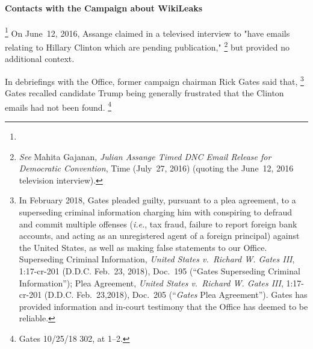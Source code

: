 \paragraph{Contacts with the Campaign about WikiLeaks}

\footnote{}
On June~12, 2016, Assange claimed in a televised interview to "have emails relating to Hillary Clinton which are pending publication,"%
\footnote{\textit{See} Mahita Gajanan, \textit{Julian Assange Timed DNC Email Release for Democratic Convention}, Time (July~27, 2016) (quoting the June~12, 2016 television interview).}
but provided no additional context.

In debriefings with the Office, former campaign chairman Rick Gates said that, %
\footnote{In February 2018, Gates pleaded guilty, pursuant to a plea agreement, to a superseding criminal information charging him with conspiring to defraud and commit multiple offenses (\textit{i.e.}, tax fraud, failure to report foreign bank accounts, and acting as an unregistered agent of a foreign principal) against the United States, as well as making false statements to our Office.
Superseding Criminal Information, \textit{United States v.\ Richard W. Gates III}, 1:17-cr-201 (D.D.C. Feb.~23, 2018), Doc.~195 (“Gates Superseding Criminal Information”);
Plea Agreement, \textit{United States v.\ Richard W. Gates III}, 1:17-cr-201 (D.D.C. Feb.~23,2018), Doc.~205 (“\textit{Gates} Plea Agreement”).
Gates has provided information and in-court testimony that the Office has deemed to be reliable.}
Gates recalled candidate Trump being generally frustrated that the Clinton emails had not been found.%
\footnote{Gates 10/25/18 302, at 1--2.}


